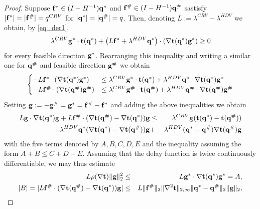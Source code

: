\documentclass[10pt,a4paper]{amsart}
\begin{document}
\begin{proof}
Suppose $\bold{f}^* \in (I - H^{-1}) \bold{q}^*$ and $\bold{f}^\# \in (I - H^{-1}) \bold{q}^\#$ sastisfy $|\bold{f}^*| = |\bold{f}^\#| = q^{CRV}$ for $|\bold{q}^*| = |\bold{q}^\#| = q$. Then, denoting $L:= \lambda^{CRV} - \lambda^{HDV}$ we obtain, by 
\eqref{eq_der1}, 
\begin{equation*}
\lambda^{CRV} \bold{g^*}\cdot \bold{t(q^*)} + \left(L \bold{f^*} + \lambda^{HDV}\bold{q^*}\right) \cdot (\nabla \bold{t}(\bold{q^*}) {\bold{g^*}})  \ge 0 
\end{equation*}
for every feasible direction $\bold{g}^*$. Rearranging this inequality and writing a similar one for $\bold{q}^\#$ and feasible direction $\bold{g}^\#$ we obtain
\begin{equation*}
\begin{cases}
-L\bold{f}^* \cdot (\nabla \bold{t}(\bold{q}^*)  \bold{g^*}) &\le \lambda^{CRV} \bold{g^*} \cdot \bold{t}(\bold{q}^*) + \lambda^{HDV} \bold{q}^* \cdot \nabla \bold{t}(\bold{q}^*) \bold{g^*}\\
-L\bold{f}^\# \cdot (\nabla \bold{t}(\bold{q}^\#)  \bold{g^\#}) &\le \lambda^{CRV} \bold{g^\#} \cdot \bold{t}(\bold{q}^\#) + \lambda^{HDV} \bold{q}^\# \cdot \nabla \bold{t}(\bold{q}^\#) \bold{g^\#}
\end{cases}
\end{equation*}
Setting $\bold{g}:= -\bold{g}^\# = \bold{g}^* = \bold{f}^\# - \bold{f}^*$ and adding the above inequalities we obtain
\begin{eqnarray*}
L\bold{g} \cdot \nabla \bold{t}(\bold{q}^*) \bold{g} + L\bold{f}^\# \cdot (\nabla \bold{t}(\bold{q}^\#) - \nabla \bold{t}(\bold{q}^*)) \bold{g} &\le&  \lambda^{CRV} \bold{g}(\bold{t}(\bold{q}^*) - \bold{t}(\bold{q}^\#))\\ +  \lambda^{HDV} \bold{q}^*(\nabla \bold{t}(\bold{q}^*) - \nabla \bold{t}(\bold{q}^\#))\bold{g} &+& \lambda^{HDV} (\bold{q}^* - \bold{q}^\#) \nabla \bold{t}(\bold{q}^\#) \bold {g}
\end{eqnarray*}
with the five terms denoted by $A, B, C, D, E$ and the inequality assuming the form $A + B \le C + D + E$. Assuming that the delay function is twice continuously differentiable, we may thus estimate
\begin{eqnarray*}
L\rho(\nabla \bold{t}) \|\bold{g}\|_2 ^2 &\le& L\bold{g}^* \cdot \nabla \bold{t}(\bold{q}^*) \bold{g^*} = A,\\
|B| = |L\bold{f}^\# \cdot (\nabla \bold{t}(\bold{q}^\#) - \nabla \bold{t}(\bold{q}^*)) \bold{g}| &\le& L \|\bold{f}^\#\|_2 \|\nabla^2 \bold{t}\|_{2,\infty} \|\bold{q}^* - \bold{q}^\#\|_2 \|\bold{g}\|_2, \\

\end{eqnarray*}
\end{proof}
\end{document}
